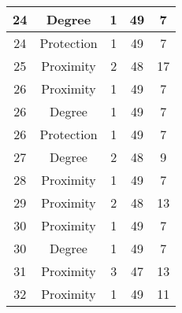 \documentclass[results.tex]{subfiles}
\begin{document}
\begin{center}
\begin{tabular}{| c || c | c | c | c |}
            \hline
            24                      & Degree                       & 1                      & 49                      & 7                    \\
            \hline
            24                      & Protection                   & 1                      & 49                      & 7                    \\
            \hline
            25                      & Proximity                    & 2                      & 48                      & 17                   \\
            \hline
            26                      & Proximity                    & 1                      & 49                      & 7                    \\
            \hline
            26                      & Degree                       & 1                      & 49                      & 7                    \\
            \hline
            26                      & Protection                   & 1                      & 49                      & 7                    \\
            \hline
            27                      & Degree                       & 2                      & 48                      & 9                    \\
            \hline
            28                      & Proximity                    & 1                      & 49                      & 7                    \\
            \hline
            29                      & Proximity                    & 2                      & 48                      & 13                   \\
            \hline
            30                      & Proximity                    & 1                      & 49                      & 7                    \\
            \hline
            30                      & Degree                       & 1                      & 49                      & 7                    \\
            \hline
            31                      & Proximity                    & 3                      & 47                      & 13                   \\
            \hline
            32                      & Proximity                    & 1                      & 49                      & 11                   \\

\end{tabular}
\end{center}
\end{document}
